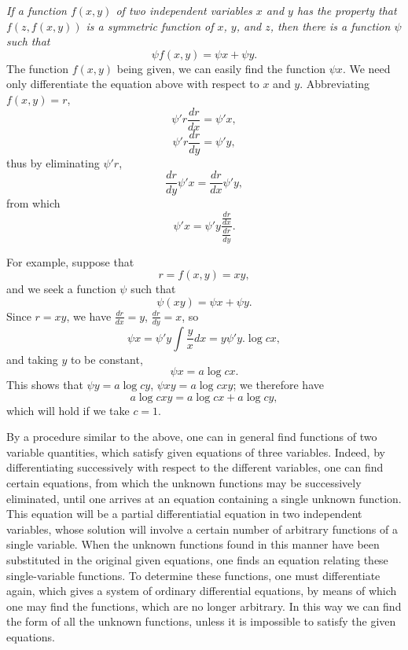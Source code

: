 \documentclass[12pt]{article}
\begin{document}
\emph{ If a function $f(x,y)$ of two independent variables $x$ and $y$ has the property that $f(z,f(x,y))$ is a symmetric function of $x$, $y$, and $z$, then there is a function $\psi$ such that 
\[ \psi f(x,y) = \psi x + \psi y. \]}
 The function $f(x,y)$ being given, we can easily find the function $\psi x$.  We need only differentiate the equation above with respect to $x$ and $y$.  Abbreviating $f(x,y) = r$,
 \[ \psi' r \frac{dr}{dx} = \psi' x,\]
 \[ \psi' r \frac{dr}{dy} = \psi' y, \]
 thus by eliminating $\psi' r$,
 \[ \frac{dr}{dy} \psi' x = \frac{dr}{dx} \psi' y, \]
 from which 
 \[ \psi' x = \psi' y \frac{\frac{dr}{dx}}{\frac{dr}{dy}} . \]

 For example, suppose that 
 \[ r = f(x,y) = xy, \]
 and we seek a function $\psi$ such that 
 \[ \psi(xy) = \psi x + \psi y. \]
Since $r = xy$, we have $\frac{dr}{dx} = y$, $\frac{dr}{dy} = x$, so
\[ \psi x = \psi' y \int \frac{y}{x} dx = y \psi' y . \log cx, \]
and taking $y$ to be constant,
\[ \psi x = a \log cx .\]
This shows that $\psi y = a \log cy$, $\psi xy = a \log c xy$; we therefore have
\[ a \log cxy = a \log cx + a \log cy, \]
which will hold if we take $c = 1$. 
 
By a procedure similar to the above, one can in general find functions of two variable quantities, which satisfy given equations of three variables.  Indeed, by differentiating successively with respect to the different variables, one can find certain equations, from which the unknown functions may be successively eliminated, until one arrives at an equation containing a single unknown function.  This equation will be a partial differentiatial equation in two independent variables, whose solution will involve a certain number of arbitrary functions of a single variable.  When the unknown functions found in this manner have been substituted in the original given equations, one finds an equation relating these single-variable functions.  To determine these functions, one must differentiate again, which gives a system of ordinary differential equations, by means of which one may find the functions, which are no longer arbitrary.  In this way we can find the form of all the unknown functions, unless it is impossible to satisfy the given equations.
  
\end{document}
